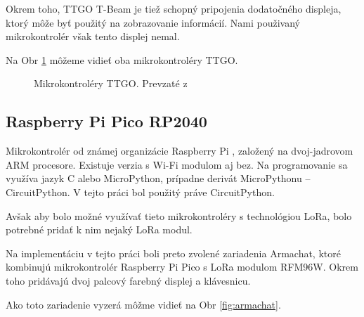 \documentclass[slovak,master]{diploma}
\begin{document}
Okrem toho, TTGO T-Beam je tiež schopný pripojenia dodatočného displeja, ktorý môže byť použitý na zobrazovanie informácií. 
Nami použivaný mikrokontrolér však tento displej nemal.

Na Obr \ref{fig:ttgo-moduly} môžeme vidieť oba mikrokontroléry TTGO.
\begin{figure}[h!]
  \centering
  \qquad
  \caption[Mikrokontroléry TTGO]{Mikrokontroléry TTGO. Prevzaté z \cite{lilygo}}
  \label{fig:ttgo-moduly}
\end{figure}

\subsection{Raspberry Pi Pico RP2040}
Mikrokontrolér od známej organizácie Raspberry Pi \cite{rpiOrg}, založený na dvoj-jadrovom ARM procesore. 
Existuje verzia s Wi-Fi modulom aj bez. Na programovanie sa využíva jazyk C alebo MicroPython, 
prípadne derivát MicroPythonu -- CircuitPython. V tejto práci bol použitý práve CircuitPython.

Avšak aby bolo možné využívať tieto mikrokontroléry s technológiou LoRa, bolo potrebné pridať k nim nejaký LoRa modul.

Na implementáciu v tejto práci boli preto zvolené zariadenia Armachat, ktoré kombinujú mikrokontrolér Raspberry Pi Pico s LoRa modulom RFM96W.
Okrem toho pridávajú dvoj palcový farebný displej a klávesnicu.

Ako toto zariadenie vyzerá môžme vidieť na Obr \ref{fig:armachat}.
\end{document}

